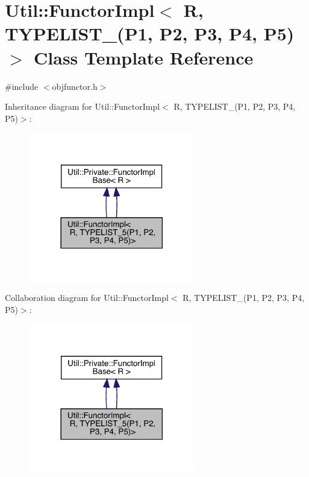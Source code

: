 \hypertarget{classUtil_1_1FunctorImpl_3_01R_00_01TYPELIST__5_07P1_00_01P2_00_01P3_00_01P4_00_01P5_08_4}{}\section{Util\+:\+:Functor\+Impl$<$ R, T\+Y\+P\+E\+L\+I\+S\+T\+\_(P1, P2, P3, P4, P5)$>$ Class Template Reference}
\label{classUtil_1_1FunctorImpl_3_01R_00_01TYPELIST__5_07P1_00_01P2_00_01P3_00_01P4_00_01P5_08_4}


{\ttfamily \#include $<$objfunctor.\+h$>$}



Inheritance diagram for Util\+:\+:Functor\+Impl$<$ R, T\+Y\+P\+E\+L\+I\+S\+T\+\_(P1, P2, P3, P4, P5)$>$\+:\nopagebreak
\begin{figure}[H]
\begin{center}
\leavevmode
\includegraphics[width=206pt]{da/dda/classUtil_1_1FunctorImpl_3_01R_00_01TYPELIST__5_07P1_00_01P2_00_01P3_00_01P4_00_01P5_08_4__inherit__graph}
\end{center}
\end{figure}


Collaboration diagram for Util\+:\+:Functor\+Impl$<$ R, T\+Y\+P\+E\+L\+I\+S\+T\+\_(P1, P2, P3, P4, P5)$>$\+:\nopagebreak
\begin{figure}[H]
\begin{center}
\leavevmode
\includegraphics[width=206pt]{d4/dbf/classUtil_1_1FunctorImpl_3_01R_00_01TYPELIST__5_07P1_00_01P2_00_01P3_00_01P4_00_01P5_08_4__coll__graph}
\end{center}
\end{figure}
